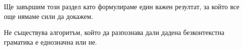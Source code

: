 


  Ще завършим този раздел като формулираме един важен резултат, за който все още нямаме сили да докажем.
  \begin{important}
    \begin{theorem}
      Не съществува алгоритъм, който да разпознава дали дадена безконтекстна граматика е еднозначна или не.
    \end{theorem}    
  \end{important}
